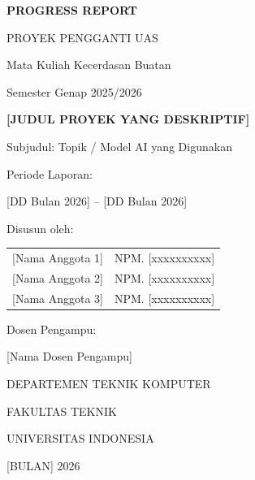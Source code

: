 \documentclass[11pt,a4paper,oneside]{report}
\begin{document}
\begin{titlepage}
\centering
\vspace*{1cm}

{\Large\bfseries PROGRESS REPORT \par}
{\large PROYEK PENGGANTI UAS \par}
\vspace{0.3cm}
{\large Mata Kuliah Kecerdasan Buatan \par}
{\large Semester Genap 2025/2026 \par}

\vspace{2cm}


\vspace{1.5cm}

{\LARGE\bfseries [JUDUL PROYEK YANG DESKRIPTIF] \par}
\vspace{0.5cm}
{\large Subjudul: Topik / Model AI yang Digunakan \par}

\vspace{2cm}

{\large Periode Laporan: \par}
{\large [DD Bulan 2026] -- [DD Bulan 2026] \par}

\vspace{1cm}

{\large Disusun oleh: \par}
\vspace{0.5cm}
\begin{tabular}{rl}
{[Nama Anggota 1]} & NPM. [xxxxxxxxxx] \\
{[Nama Anggota 2]} & NPM. [xxxxxxxxxx] \\
{[Nama Anggota 3]} & NPM. [xxxxxxxxxx] \\
\end{tabular}

\vspace{1.5cm}

{\large Dosen Pengampu: \par}
{\large [Nama Dosen Pengampu] \par}

\vfill

{\large DEPARTEMEN TEKNIK KOMPUTER \par}
{\large FAKULTAS TEKNIK \par}
{\large UNIVERSITAS INDONESIA \par}
{\large [BULAN] 2026 \par}
\end{titlepage}
\end{document}
